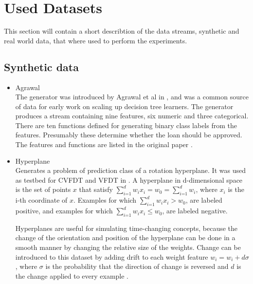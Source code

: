 \documentclass[12pt,oneside,a4paper,parskip]{scrbook}
\begin{document}
\section{Used Datasets}

This section will contain a short describtion of the data streams, synthetic and real world data, that where used to 
perform the experiments.

\subsection{Synthetic data}

\begin{itemize}
  \item Agrawal\\
        The generator was introduced by Agrawal et al in \cite{agrawal1993database}, and was a common source of data for early work on scaling up 
        decision tree learners. The generator produces a stream containing nine features, six numeric and three categorical. 
        There are ten functions defined for generating binary class labels from the features. Presumably these determine 
        whether the loan should be approved. The features and functions are listed in the original paper \cite{agrawal1993database,skmultiflow}.

  \item Hyperplane\\
        Generates a problem of prediction class of a rotation hyperplane. It was used as testbed for CVFDT and VFDT in \cite{hyperplane}.
        A hyperplane in d-dimensional space is the set of points $x$ that satisfy $\sum^d_\textit{i=1} w_ix_i=w_0 = \sum^d_\textit{i=1} w_i$,
        where $x_i$ is the i-th coordinate of $x$.  Examples for which $\sum^d_\textit{i=1} w_ix_i>w_0$, are 
        labeled positive, and examples for which $\sum^d_\textit{i=1}w_ix_i\leq w_0$, are labeled negative.

        Hyperplanes are useful for simulating time-changing concepts, because the change of the orientation and position
        of the hyperplane can be done in a smooth manner by changing the relative size of the weights.
        Change can be introduced to this dataset by adding drift to each weight feature $w_i=w_i + d\sigma$, where $\sigma$ is the 
        probability that the direction of change is reversed and $d$ is the change applied to every example \cite{skmultiflow}.


\end{itemize}
\end{document}
